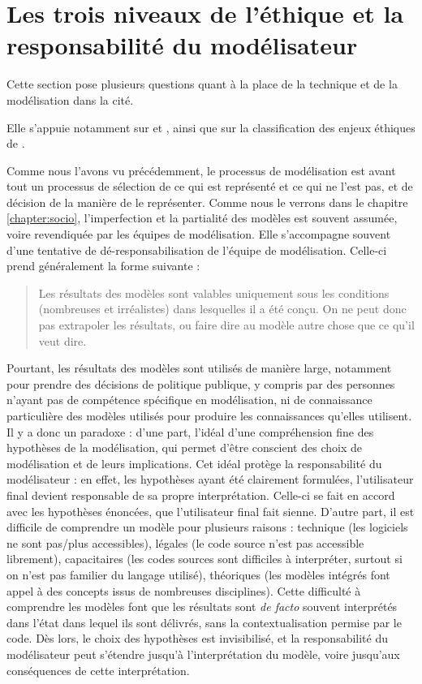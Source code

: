 \section{Les trois niveaux de l'éthique et la responsabilité du modélisateur}

Cette section pose plusieurs questions quant à la place de la technique et de la modélisation dans la cité. 

Elle s'appuie notamment sur \cite{jonas_principe_2008} et \cite{vast machine}, ainsi que sur la classification des enjeux éthiques de \cite{tuana_leading_2010}.


Comme nous l'avons vu précédemment, le processus de modélisation est avant tout un processus de sélection de ce qui est représenté et ce qui ne l'est pas, et de décision de la manière de le représenter. Comme nous le verrons dans le chapitre \ref{chapter:socio}, l'imperfection et la partialité des modèles est souvent assumée, voire revendiquée par les équipes de modélisation. Elle s'accompagne souvent d'une tentative de dé-responsabilisation de l'équipe de modélisation. Celle-ci prend généralement la forme suivante : 

\begin{quote}
    Les résultats des modèles sont valables uniquement sous les conditions (nombreuses et irréalistes) dans lesquelles il a été conçu. On ne peut donc pas extrapoler les résultats, ou faire dire au modèle autre chose que ce qu'il veut dire. 
\end{quote}
Pourtant, les résultats des modèles sont utilisés de manière large, notamment pour prendre des décisions de politique publique, y compris par des personnes n'ayant pas de compétence spécifique en modélisation, ni de connaissance particulière des modèles utilisés pour produire les connaissances qu'elles utilisent. Il y a donc un paradoxe : d'une part, l'idéal d'une compréhension fine des hypothèses de la modélisation, qui permet d'être conscient des choix de modélisation et de leurs implications. Cet idéal protège la responsabilité du modélisateur : en effet, les hypothèses ayant été clairement formulées, l'utilisateur final devient responsable de sa propre interprétation. Celle-ci se fait en accord avec les hypothèses énoncées, que l'utilisateur final fait sienne. D'autre part, il est difficile de comprendre un modèle pour plusieurs raisons : technique (les logiciels ne sont pas/plus accessibles), légales (le code source n'est pas accessible librement), capacitaires (les codes sources sont difficiles à interpréter, surtout si on n'est pas familier du langage utilisé), théoriques (les modèles intégrés font appel à des concepts issus de nombreuses disciplines). Cette difficulté à comprendre les modèles font que les résultats sont \textit{de facto} souvent interprétés dans l'état dans lequel ils sont délivrés, sans la contextualisation permise par le code. Dès lors, le choix des hypothèses est invisibilisé, et la responsabilité du modélisateur peut s'étendre jusqu'à l'interprétation du modèle, voire jusqu'aux conséquences de cette interprétation. \\

